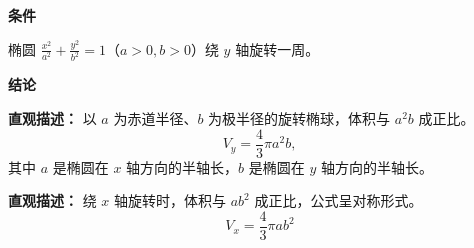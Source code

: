 \begin{statementbox}

\textbf{\textcolor{CStatement}{条件}}
\begin{description}[style=nextline, leftmargin=2.8em, labelsep=0.5em, itemsep=0.35em]
    \item[\textbf{\textcolor{CStatement}{条件1（椭圆与旋转轴）：}}] 椭圆 $\frac{x^2}{a^2}+\frac{y^2}{b^2}=1$（$a>0, b>0$）绕 $y$ 轴旋转一周。
\end{description}

\textbf{\textcolor{CStatement}{结论}}
\begin{description}[style=nextline, leftmargin=2.8em, labelsep=0.5em, itemsep=0.45em]
    \item[\textbf{\textcolor{CStatement}{结论一（旋转椭球体积）：}}]
    \textbf{\textcolor{CStatement}{直观描述：}} 以 $a$ 为赤道半径、$b$ 为极半径的旋转椭球，体积与 $a^2b$ 成正比。
    \[
    V_y = \frac{4}{3}\pi a^2 b ,
    \]
    其中 $a$ 是椭圆在 $x$ 轴方向的半轴长，$b$ 是椭圆在 $y$ 轴方向的半轴长。

    \item[\textbf{\textcolor{CStatement}{推广结论（绕x轴体积）：}}]
    \textbf{\textcolor{CStatement}{直观描述：}} 绕 $x$ 轴旋转时，体积与 $ab^2$ 成正比，公式呈对称形式。
    \[
    V_x = \frac{4}{3}\pi a b^2
    \]
\end{description}

\end{statementbox}
